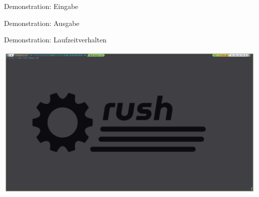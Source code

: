 \begin{frame}{Demonstration: Eingabe}
\end{frame}

\begin{frame}{Demonstration: Ausgabe}
\end{frame}

\begin{frame}{Demonstration: Laufzeitverhalten}
	\begin{center}
		\href{run:assets/01_rush_presentation_vm.mp4}{
			\includegraphics[width=\textwidth]{assets/01_rush_presentation_vm.png}
		}
	\end{center}
\end{frame}
